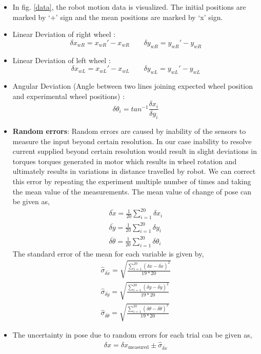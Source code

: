 \begin{itemize}
\item In fig. \ref{data}, the robot motion data is visualized. The initial positions are marked by `+' sign and the mean positions are marked by `x' sign.
\item Linear Deviation of right wheel : 
	$$\delta x_{wR} = x_{wR}' - x_{wR} \qquad \delta y_{wR} = y_{wR}' - y_{wR}$$
\item Linear Deviation of left wheel : 
	$$\delta x_{wL} = x_{wL}' - x_{wL} \qquad \delta y_{wL} = y_{wL}' - y_{wL}$$
\item Angular Deviation (Angle between two lines joining expected wheel position and experimental wheel positions) : 
	$$\delta \theta_i = tan^{-1}\frac{\delta x_{i}}{\delta y_{i}}$$
\item \textbf{Random errors}: Random errors are caused by inability of the sensors to measure the input beyond certain resolution. In our case inability to resolve current supplied beyond certain resolution would result in slight deviations in torques torques generated in motor which results in wheel rotation and ultimately results in variations in distance travelled by robot. We can correct this error by repeating the experiment multiple number of times and taking the mean value of the measurements. The mean value of change of pose can be given as,
\begin{align*}
\overline{\delta x} = \frac{1}{20} \sum_{i=1}^{20} \delta x_i \\
\overline{\delta y} = \frac{1}{20} \sum_{i=1}^{20} \delta y_i \\
\overline{\delta \theta} = \frac{1}{20} \sum_{i=1}^{20} \delta \theta_i
\end{align*}
The standard error of the mean for each variable is given by,
\begin{align*}
\hat{\sigma}_{\overline{\delta x}} = \sqrt{\frac{\sum_{i=1}^{20} (\delta x - \overline{\delta x})^2}{19 * 20}} \\
\hat{\sigma}_{\overline{\delta y}} = \sqrt{\frac{\sum_{i=1}^{20} (\delta y - \overline{\delta y})^2}{19 * 20}} \\
\hat{\sigma}_{\overline{\delta \theta}} = \sqrt{\frac{\sum_{i=1}^{20} (\delta \theta - \overline{\delta \theta})^2}{19 * 20}}
\end{align*}
\item The uncertainty in pose due to random errors for each trial can be given as,
\begin{align*}
\delta x = \delta x_{\text{measured}} \pm \hat{\sigma}_{\overline{\delta x}} \\

\end{align*}
\end{itemize}
